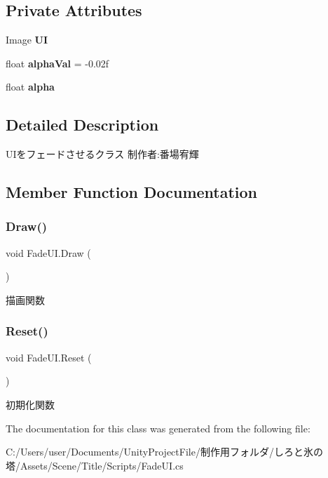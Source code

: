 \subsection*{Private Attributes}
\begin{DoxyCompactItemize}
\item 
\mbox{\label{class_fade_u_i_a39efd23289912d8dbf2c86071161da52}} 
Image {\bfseries UI}
\item 
\mbox{\label{class_fade_u_i_a35b94bc7a1bf9bb316e2fcd09c0611aa}} 
float {\bfseries alpha\+Val} = -\/0.\+02f
\item 
\mbox{\label{class_fade_u_i_af0da49597d2a2790024ba8c329911824}} 
float {\bfseries alpha}
\end{DoxyCompactItemize}


\subsection{Detailed Description}
U\+Iをフェードさせるクラス 制作者\+:番場宥輝 



\subsection{Member Function Documentation}
\mbox{\label{class_fade_u_i_a9e2c69e9145c0fa0321070a7ad92222b}} 
\subsubsection{\texorpdfstring{Draw()}{Draw()}}
{\footnotesize\ttfamily void Fade\+U\+I.\+Draw (\begin{DoxyParamCaption}{ }\end{DoxyParamCaption})\hspace{0.3cm}{\ttfamily [inline]}}



描画関数 

\mbox{\label{class_fade_u_i_ad501c58fdd749daf61d6e48f0ccb20a9}} 
\subsubsection{\texorpdfstring{Reset()}{Reset()}}
{\footnotesize\ttfamily void Fade\+U\+I.\+Reset (\begin{DoxyParamCaption}{ }\end{DoxyParamCaption})\hspace{0.3cm}{\ttfamily [inline]}}



初期化関数 



The documentation for this class was generated from the following file\+:\begin{DoxyCompactItemize}
\item 
C\+:/\+Users/user/\+Documents/\+Unity\+Project\+File/制作用フォルダ/しろと氷の塔/\+Assets/\+Scene/\+Title/\+Scripts/Fade\+U\+I.\+cs\end{DoxyCompactItemize}
